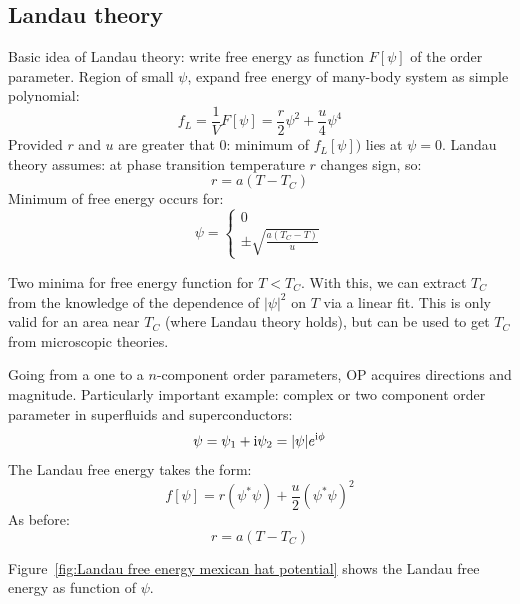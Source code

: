 \documentclass[../notes.tex]{subfiles}
\begin{document}
\subsection{Landau theory}

Basic idea of Landau theory: write free energy as function \(F[\psi]\) of the order parameter.
Region of small \(\psi\), expand free energy of many-body system as simple polynomial:
\begin{equation}
	f_{L} = \frac{1}{V} F[\psi] = \frac{r}{2} \psi^2 + \frac{u}{4} \psi^4
\end{equation}
Provided \(r\) and \(u\) are greater that \(0\): minimum of \(f_L [\psi])\) lies at \(\psi = 0\).
Landau theory assumes: at phase transition temperature \(r\) changes sign, so:
\begin{equation}
	r = a(T - T_C)
\end{equation}
Minimum of free energy occurs for:
\begin{equation}
	\psi = \begin{cases}
		0 \\
		\pm \sqrt{\frac{a (T_C - T)}{u} }
	\end{cases}
\end{equation}

Two minima for free energy function for \(T < T_C\).
With this, we can extract \(T_C\) from the knowledge of the dependence of \(\vert \psi \vert^2\) on \(T\) via a linear fit.
This is only valid for an area near \(T_C\) (where Landau theory holds), but can be used to get \(T_C\) from microscopic theories.

Going from a one to a \(n\)-component order parameters, OP acquires directions and magnitude.
Particularly important example: complex or two component order parameter in superfluids and superconductors:
\begin{equation}
	\psi = \psi_1 + \mathrm{i} \psi_2 = \vert \psi \vert e^{\mathrm{i} \phi}
\end{equation}
The Landau free energy takes the form:
\begin{equation}
	f[\psi] = r(\psi^* \psi) + \frac{u}{2} (\psi^* \psi)^2
\end{equation}
As before:
\begin{equation}
	r = a(T - T_C)
\end{equation}

Figure~\ref{fig:Landau free energy mexican hat potential} shows the Landau free energy as function of \(\psi\).
\end{document}
